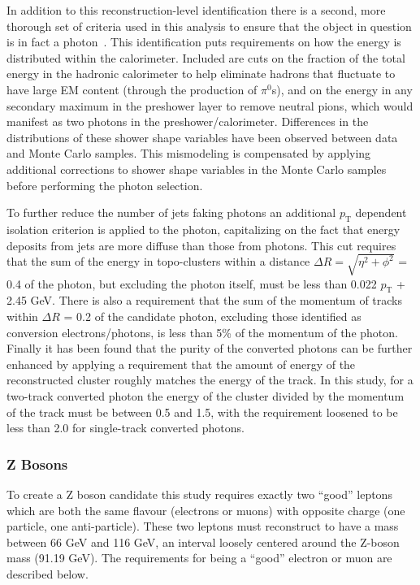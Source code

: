 In addition to this reconstruction-level identification there is a second, more thorough set of criteria used in this analysis to ensure that the object in question is in fact a photon~\cite{ATL-PHYS-PUB-2016-014}.  
This identification puts requirements on how the energy is distributed within the calorimeter.  
Included are cuts on the fraction of the total energy in the hadronic calorimeter to help eliminate hadrons that fluctuate to have large EM content (through the production of $\pi^0$s), and on the energy in any secondary maximum in the preshower layer to remove neutral pions, which would manifest as two photons in the preshower/calorimeter.  
Differences in the distributions of these shower shape variables have been observed between data and Monte Carlo samples.  
This mismodeling is compensated by applying additional corrections to shower shape variables in the Monte Carlo samples before performing the photon selection.  

To further reduce the number of jets faking photons an additional $p_{\mathrm{T}}$ dependent isolation criterion is applied to the photon, capitalizing on the fact that energy deposits from jets are more diffuse than those from photons.  
This cut requires that the sum of the energy in topo-clusters within a distance $\Delta R=\sqrt{\eta^2+\phi^2}$ = 0.4 of the photon, but excluding the photon itself, must be less than 0.022 $p_{\mathrm{T}}$ + 2.45 GeV.  
There is also a requirement that the sum of the momentum of tracks within $\Delta R$ = 0.2 of the candidate photon, excluding those identified as conversion electrons/photons, is less than 5\% of the momentum of the photon.  
Finally it has been found that the purity of the converted photons can be further enhanced by applying a requirement that the amount of energy of the reconstructed cluster roughly matches the energy of the track.  
In this study, for a two-track converted photon the energy of the cluster divided by the momentum of the track must be between 0.5 and 1.5, with the requirement loosened to be less than 2.0 for single-track converted photons.  


\subsubsection{Z Bosons}
To create a Z boson candidate this study requires exactly two ``good'' leptons which are both the same flavour (electrons or muons) with opposite charge (one particle, one anti-particle). 
These two leptons must reconstruct to have a mass between 66 GeV and 116 GeV, an interval loosely centered around the Z-boson mass (91.19 GeV).  
The requirements for being a ``good'' electron or muon are described below.  

